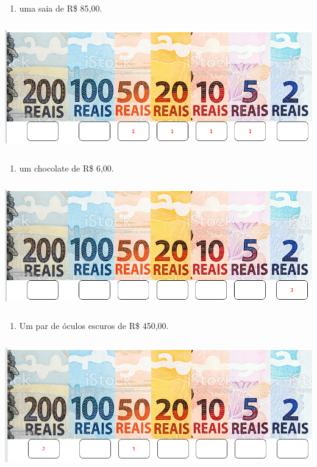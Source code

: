 \begin{enumerate}
\def\labelenumi{\Alph{enumi})}
\item
  uma saia de R\$ 85,00.
\end{enumerate}

\includegraphics[width=5.90556in,height=2.18056in]{media/image68.png}

\begin{enumerate}
\def\labelenumi{\Alph{enumi})}
\item
  um chocolate de R\$ 6,00.
\end{enumerate}

\includegraphics[width=5.90556in,height=2.14583in]{media/image69.png}

\begin{enumerate}
\def\labelenumi{\Alph{enumi})}
\item
  Um par de óculos escuros de R\$ 450,00.
\end{enumerate}

\includegraphics[width=5.90556in,height=2.19931in]{media/image70.png}

